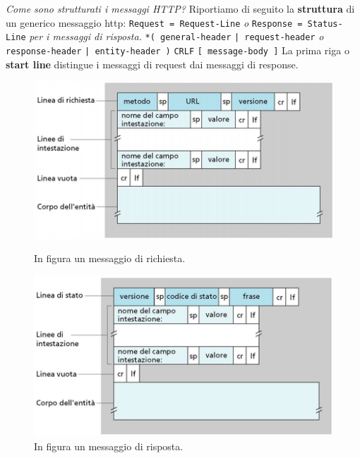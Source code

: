 \documentclass[11pt,a4paper]{article}
\theoremstyle{definition}
\begin{document}
\textit{Come sono strutturati i messaggi HTTP?}\newline\newline
Riportiamo di seguito la \textbf{struttura} di un generico messaggio http:\newline
\texttt{Request = Request-Line} \textit{o} \texttt{Response = Status-Line} \textit{per i messaggi di risposta.}\newline
\texttt{*( general-header}\newline
\texttt{| request-header} \textit{o} \texttt{response-header}\newline
\texttt{| entity-header )}\newline
\texttt{CRLF}\newline
\texttt{[ message-body ]}\newline
La prima riga o \textbf{start line} distingue i messaggi di request dai messaggi di response.
\begin{figure}[!h]
	\centering
	\begin{minipage}[b]{0.4\textwidth}
		\includegraphics[scale=0.4]{Immagini/Http_req.png}
		\caption{In figura un messaggio di richiesta.}
	\end{minipage}
	\hfill
	\begin{minipage}[b]{0.4\textwidth}
		\includegraphics[scale=0.4]{Immagini/Http_res.png}
		\caption{In figura un messaggio di risposta.}
	\end{minipage}
\end{figure}
\end{document}
